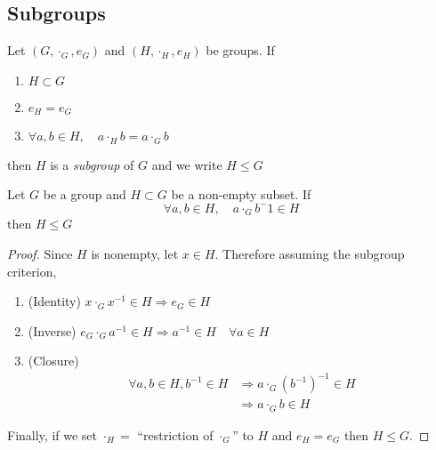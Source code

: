 \documentclass{article}
\begin{document}
\subsection{Subgroups}
\begin{defi}[Subgroup]
    Let $(G, \cdot_G, e_G)$ and $(H, \cdot_H, e_H)$ be groups. If
    \begin{enumerate}
        \item $H \subset G$
        \item $e_H = e_G$
        \item $\forall a, b \in H, \quad a \cdot_H b = a \cdot_G b$
    \end{enumerate}
    then $H$ is a \emph{subgroup} of $G$ and we write $H \leq G$
\end{defi}

\begin{prop}
    Let $G$ be a group and $H \subset G$ be a non-empty subset. If
    \[
        \forall a, b \in H, \quad a \cdot_G b^-1 \in H
    \]
    then $H \leq G$
\end{prop}

\begin{proof}
    Since $H$ is nonempty, let $x \in H$. Therefore assuming the subgroup criterion,
    \begin{enumerate}
        \item (Identity) $x \cdot_G x^{-1} \in H \Rightarrow e_G \in H$
        \item (Inverse) $e_G \cdot_G a^{-1} \in H \Rightarrow a^{-1} \in H \quad \forall a \in H$
        \item (Closure) \begin{align*}
            \forall a, b \in H, b^{-1} \in H \tag{by Inverse} &\Rightarrow a \cdot_G (b^{-1})^{-1} \in H \\
            &\Rightarrow a \cdot_G b \in H
        \end{align*}
    \end{enumerate}
    Finally, if we set $\cdot_H =$ ``restriction of $\cdot_G$'' to $H$ and $e_H = e_G$ then $H \leq G$. 
\end{proof}
\end{document}
